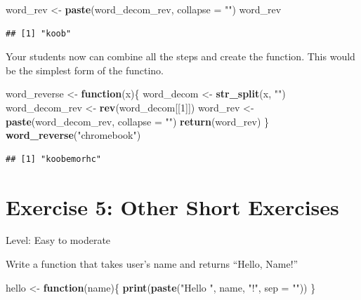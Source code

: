 \documentclass[]{book}
\newenvironment{Shaded}{\begin{snugshade}}{\end{snugshade}}
\newcommand{\ControlFlowTok}[1]{\textcolor[rgb]{0.13,0.29,0.53}{\textbf{#1}}}
\newcommand{\DataTypeTok}[1]{\textcolor[rgb]{0.13,0.29,0.53}{#1}}
\newcommand{\DecValTok}[1]{\textcolor[rgb]{0.00,0.00,0.81}{#1}}
\newcommand{\KeywordTok}[1]{\textcolor[rgb]{0.13,0.29,0.53}{\textbf{#1}}}
\newcommand{\NormalTok}[1]{#1}
\newcommand{\StringTok}[1]{\textcolor[rgb]{0.31,0.60,0.02}{#1}}
\begin{document}
\begin{Shaded}
\begin{Highlighting}[]
\NormalTok{word_rev <-}\StringTok{ }\KeywordTok{paste}\NormalTok{(word_decom_rev, }\DataTypeTok{collapse =} \StringTok{""}\NormalTok{)}
\NormalTok{word_rev}
\end{Highlighting}
\end{Shaded}

\begin{verbatim}
## [1] "koob"
\end{verbatim}

Your students now can combine all the steps and create the function. This would be the simplest form of the functino.

\begin{Shaded}
\begin{Highlighting}[]
\NormalTok{word_reverse <-}\StringTok{ }\ControlFlowTok{function}\NormalTok{(x)\{}
\NormalTok{    word_decom <-}\StringTok{ }\KeywordTok{str_split}\NormalTok{(x, }\StringTok{""}\NormalTok{)}
\NormalTok{    word_decom_rev <-}\StringTok{ }\KeywordTok{rev}\NormalTok{(word_decom[[}\DecValTok{1}\NormalTok{]])}
\NormalTok{    word_rev <-}\StringTok{ }\KeywordTok{paste}\NormalTok{(word_decom_rev, }\DataTypeTok{collapse =} \StringTok{""}\NormalTok{)}
    \KeywordTok{return}\NormalTok{(word_rev)}
\NormalTok{\}}
\KeywordTok{word_reverse}\NormalTok{(}\StringTok{"chromebook"}\NormalTok{)}
\end{Highlighting}
\end{Shaded}

\begin{verbatim}
## [1] "koobemorhc"
\end{verbatim}

\hypertarget{exercise-5-other-short-exercises}{%
\section*{Exercise 5: Other Short Exercises}\label{exercise-5-other-short-exercises}}

Level: Easy to moderate

Write a function that takes user's name and returns ``Hello, Name!''

\begin{Shaded}
\begin{Highlighting}[]
\NormalTok{hello <-}\StringTok{ }\ControlFlowTok{function}\NormalTok{(name)\{}
    \KeywordTok{print}\NormalTok{(}\KeywordTok{paste}\NormalTok{(}\StringTok{"Hello "}\NormalTok{, name, }\StringTok{"!"}\NormalTok{, }\DataTypeTok{sep =} \StringTok{""}\NormalTok{))}
\NormalTok{\}}
\end{Highlighting}
\end{Shaded}
\end{document}
